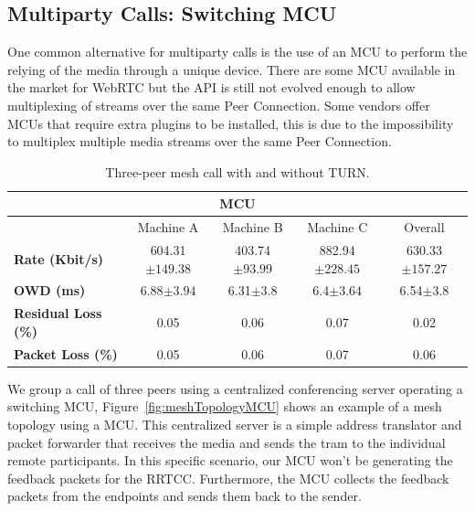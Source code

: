\FloatBarrier


\subsection{Multiparty Calls: Switching MCU}

One common alternative for multiparty calls is the use of an MCU to perform the relying of the media through a unique device. There are some MCU available in the market for WebRTC but the API is still not evolved enough to allow multiplexing of streams over the same Peer Connection. Some vendors offer MCUs that require extra plugins to be installed, this is due to the impossibility to multiplex multiple media streams over the same Peer Connection.

\begin{table}[h]
\begin{center}
\begin{adjustwidth}{-1.2em}{}
	\begin{tabular}{|l|c|c|c|c| }
	\hline
	\multicolumn{5}{|c|}{\textbf{MCU}} \\ \hline
    	 & Machine A & Machine B & Machine C & Overall \\ \hline
\textbf{Rate (Kbit/s)} & 604.31$\pm149.38$ & 403.74$\pm93.99$ & 882.94$\pm228.45$ & 630.33$\pm157.27$\\\hline
 \textbf{OWD (ms)} &  6.88$\pm3.94$ & 6.31$\pm3.8$ & 6.4$\pm3.64$ & 6.54$\pm3.8$\\\hline
 \textbf{Residual Loss (\%)} & 0.05 & 0.06 & 0.07 & 0.02\\\hline
 \textbf{Packet Loss (\%)} & 0.05 & 0.06 & 0.07 & 0.06 \\ \hline
	\end{tabular}
	\end{adjustwidth}
    \caption[Three-peer mesh call with and without TURN]{Three-peer mesh call with and without TURN.}
    \label{fig:mesh_results}
\end{center}
\end{table}

We group a call of three peers using a centralized conferencing server operating a switching MCU, Figure~\ref{fig:meshTopologyMCU} shows an example of a mesh topology using a MCU. This centralized server is a simple address translator and packet forwarder that receives the media and sends the tram to the individual remote participants. In this specific scenario, our MCU won't be generating the feedback packets for the RRTCC. Furthermore, the MCU collects the feedback packets from the endpoints and sends them back to the sender.

